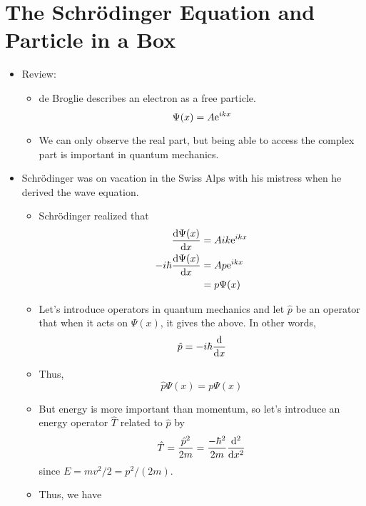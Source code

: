 \documentclass[../notes.tex]{subfiles}
\begin{document}
\section{The Schr\"{o}dinger Equation and Particle in a Box}
\begin{itemize}
    \item {}Review:
    \begin{itemize}
        \item de Broglie describes an electron as a free particle.
        \begin{equation*}
            \Psi(x) = A\e[ikx]
        \end{equation*}
        \item We can only observe the real part, but being able to access the complex part is important in quantum mechanics.
    \end{itemize}
    \item Schr\"{o}dinger was on vacation in the Swiss Alps with his mistress when he derived the wave equation.
    \begin{itemize}
        \item Schr\"{o}dinger realized that
        \begin{align*}
            \dv{\Psi(x)}{x} &= Aik\e[ikx]\\
            -i\hbar\dv{\Psi(x)}{x} &= Ap\e[ikx]\\
            &= p\Psi(x)
        \end{align*}
        \item Let's introduce operators in quantum mechanics and let $\hat{p}$ be an operator that when it acts on $\Psi(x)$, it gives the above. In other words,
        \begin{equation*}
            \hat{p} = -i\hbar\dv{x}
        \end{equation*}
        \item Thus,
        \begin{equation*}
            \hat{p}\Psi(x) = p\Psi(x)
        \end{equation*}
        \item But energy is more important than momentum, so let's introduce an energy operator $\hat{T}$ related to $\hat{p}$ by
        \begin{equation*}
            \hat{T} = \frac{\hat{p}^2}{2m}
            = \frac{-\hbar^2}{2m}\dv[2]{x}
        \end{equation*}
        since $E=mv^2/2=p^2/(2m)$.
        \item Thus, we have

\end{itemize}
\end{itemize}
\end{document}
